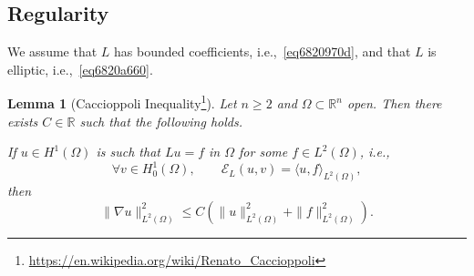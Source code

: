\documentclass[a4paper,9pt]{amsart}
\newcommand{\scr}[1]{\mathscr{#1}}
\newcommand{\R}{\mathbb{R}}	%
\newcommand{\grad}{\nabla}
\theoremstyle{plain}
\newtheorem{lemma}[proposition]{Lemma}
\theoremstyle{definition}
\theoremstyle{remark}
\begin{document}
\subsection{Regularity}

We assume that $L$ has bounded coefficients, i.e.,~\eqref{eq6820970d},
and that $L$ is elliptic, i.e.,~\eqref{eq6820a660}.

\begin{lemma}[Caccioppoli Inequality\footnote{\url{https://en.wikipedia.org/wiki/Renato_Caccioppoli}}]\label{lem6822fc0f}
	Let $n\ge2$ and $\Omega\subset\R^n$ open.
	Then there exists $C\in\R$ such that the following holds.
	
	If $u\in H^1(\Omega)$ is such that $Lu=f$ in $\Omega$ for some $f\in L^2(\Omega)$,
	i.e., 
	\begin{equation}
		\forall v\in H^1_0(\Omega),\qquad
		\scr E_L(u,v) = \langle u,f \rangle_{L^2(\Omega)} ,
	\end{equation}
	then
	\begin{equation}\label{eq6822fc08}
		\|\grad u\|_{L^2(\Omega)}^2 \le C (\|u\|_{L^2(\Omega)}^2 + \|f\|_{L^2(\Omega)}^2 ) .
	\end{equation}
\end{lemma}
\end{document}
